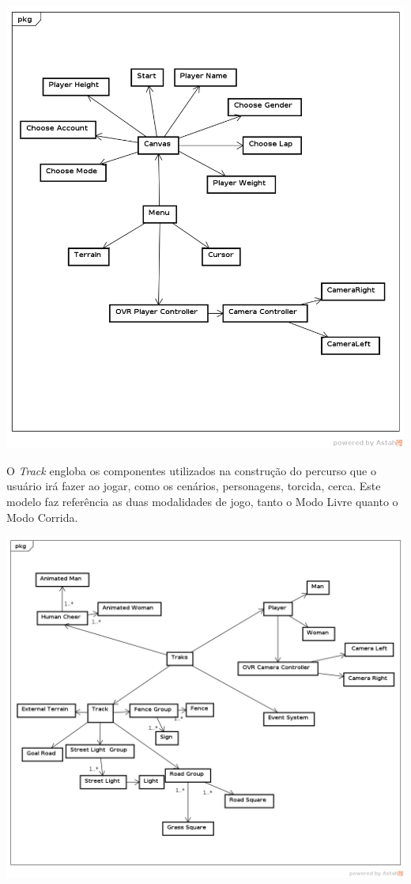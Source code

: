\begin{center}
	\includegraphics[scale=0.5]{figuras/menu_domain}
	\label{figura:menu_domain}
\end{center}

O \textit{Track} engloba os componentes utilizados na construção do percurso que o usuário irá fazer ao jogar, como os cenários, personagens, torcida, cerca. Este modelo faz referência as duas modalidades de jogo, tanto o Modo Livre quanto o Modo Corrida.

\begin{center}
	\includegraphics[scale=0.5]{figuras/main_domain}
	\label{figura:main_domain}
\end{center}


